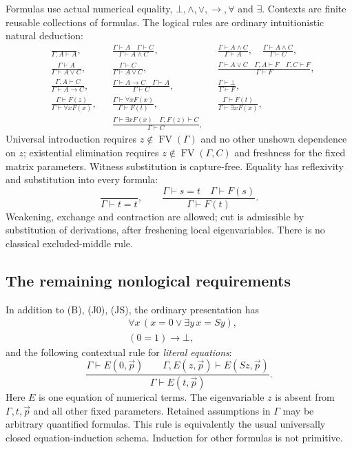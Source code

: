 \documentclass[11pt]{article}
\theoremstyle{definition}
\newcommand{\FV}{\operatorname{FV}}
\newcommand{\seq}{\vdash}
\begin{document}
Formulas use actual numerical equality, $\bot,\land,\lor,\to,\forall$
and $\exists$. Contexts are finite reusable collections of formulas.
The logical rules are ordinary intuitionistic natural deduction:
\begin{align*}
 &\frac{}{\Gamma,A\seq A},
 &&\frac{\Gamma\seq A\quad\Gamma\seq C}{\Gamma\seq A\land C},
 &&\frac{\Gamma\seq A\land C}{\Gamma\seq A},\quad
   \frac{\Gamma\seq A\land C}{\Gamma\seq C},\\[4pt]
 &\frac{\Gamma\seq A}{\Gamma\seq A\lor C},
 &&\frac{\Gamma\seq C}{\Gamma\seq A\lor C},
 &&\frac{\Gamma\seq A\lor C\quad\Gamma,A\seq F\quad\Gamma,C\seq F}
          {\Gamma\seq F},\\[4pt]
 &\frac{\Gamma,A\seq C}{\Gamma\seq A\to C},
 &&\frac{\Gamma\seq A\to C\quad\Gamma\seq A}{\Gamma\seq C},
 &&\frac{\Gamma\seq\bot}{\Gamma\seq F},\\[4pt]
 &\frac{\Gamma\seq F(z)}{\Gamma\seq\forall xF(x)},
 &&\frac{\Gamma\seq\forall xF(x)}{\Gamma\seq F(t)},
 &&\frac{\Gamma\seq F(t)}{\Gamma\seq\exists xF(x)},\\[4pt]
 &&&\frac{\Gamma\seq\exists xF(x)\quad\Gamma,F(z)\seq C}{\Gamma\seq C}.
 \end{align*}
Universal introduction requires $z\notin\FV(\Gamma)$ and no other
unshown dependence on $z$; existential elimination requires
$z\notin\FV(\Gamma,C)$ and freshness for the fixed matrix parameters.
Witness substitution is capture-free. Equality has reflexivity and
substitution into every formula:
\[
 \frac{}{\Gamma\seq t=t},\qquad
 \frac{\Gamma\seq s=t\quad\Gamma\seq F(s)}{\Gamma\seq F(t)}.
\]
Weakening, exchange and contraction are allowed; cut is admissible by
substitution of derivations, after freshening local eigenvariables.
There is no classical excluded-middle rule.

\subsection{The remaining nonlogical requirements}

In addition to (B), (J0), (JS), the ordinary presentation has
\begin{align}
 &\forall x\,(x=0\lor\exists y\,x=Sy),\tag{Cov}\label{ax:Cov}\\
 &(0=1)\to\bot,\tag{Sep}\label{ax:Sep}
\end{align}
and the following contextual rule for \emph{literal equations}:
\[
 \frac{\Gamma\seq E(0,\vec p)\qquad
       \Gamma,E(z,\vec p)\seq E(Sz,\vec p)}
      {\Gamma\seq E(t,\vec p)}.
 \tag{EI}\label{rule:EI}
\]
Here $E$ is one equation of numerical terms. The eigenvariable $z$ is
absent from $\Gamma,t,\vec p$ and all other fixed parameters. Retained
assumptions in $\Gamma$ may be arbitrary quantified formulas. This rule
is equivalently the usual universally closed equation-induction schema.
Induction for other formulas is not primitive.
\end{document}
